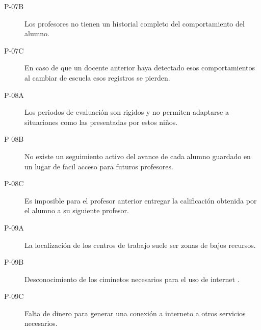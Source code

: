 \begin{description}
    \item[P-07B] Los profesores no tienen un historial completo del comportamiento del alumno.
	\item[P-07C] En caso de que un docente anterior haya detectado esos comportamientos al cambiar de escuela esos registros se pierden.
 \item[P-08A] Los periodos de evaluación son rigidos y no permiten adaptarse a situaciones como las presentadas por estos niños.
    \item[P-08B] No existe un seguimiento activo del avance de cada alumno guardado en un lugar de facil acceso para futuros profesores.
	\item[P-08C] Es imposible para el profesor anterior entregar la calificación obtenida por el alumno a su siguiente profesor.
 \item[P-09A] La localización de los centros de trabajo suele ser zonas de bajos recursos.
    \item[P-09B] Desconocimiento de los ciminetos necesarios para el uso de internet .
	\item[P-09C] Falta de dinero para generar una conexión a interneto a otros servicios necesarios.
\end{description}


